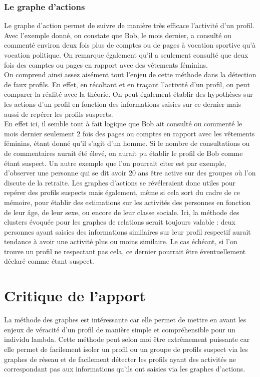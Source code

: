 \documentclass[12pt]{report}
\begin{document}
\subsubsection{Le graphe d'actions}
Le graphe d'action permet de suivre de manière très efficace  l'activité d'un profil. Avec l'exemple donné, on constate que Bob, le mois dernier, a consulté ou commenté environ deux fois plus de comptes ou de pages à vocation sportive qu'à vocation politique. On remarque également qu'il a seulement consulté que deux fois des comptes ou pages en rapport avec des vêtements féminins. \\

On comprend ainsi assez aisément tout l'enjeu de cette méthode dans la détection de faux profils. En effet, en récoltant et en traçant l'activité d'un profil, on peut comparer la réalité avec la théorie. On peut également établir des hypothèses sur les actions d'un profil en fonction des informations saisies sur ce dernier mais aussi de repérer les profils suspects. \\

En effet ici, il semble tout à fait logique que Bob ait consulté ou commenté le mois dernier seulement 2 fois des pages ou comptes en rapport avec les vêtements féminins, étant donné qu'il s'agit d'un homme. Si le nombre de consultations ou de commentaires aurait été élevé, on aurait pu établir le profil de Bob comme étant suspect. Un autre exemple que l'on pourrait citer est par exemple, d'observer une personne qui se dit avoir 20 ans être active sur des groupes où l'on discute de la retraite. Les graphes d'actions se révéleraient donc utiles pour repérer des profils suspects mais également, même si cela sort du cadre de ce mémoire, pour établir des estimations sur les activités des personnes en fonction de leur âge, de leur sexe, ou encore de leur classe sociale. Ici, la méthode des clusters évoquée pour les graphes de relations serait toujours valable : deux personnes ayant saisies des informations similaires sur leur profil respectif aurait tendance à avoir une activité plus ou moins similaire. Le cas échéant, si l'on trouve un profil ne respectant pas cela, ce dernier pourrait être éventuellement déclaré comme étant suspect.

\section{Critique de l'apport}
La méthode des graphes est intéressante car elle permet de mettre en avant les enjeux de véracité d'un profil de manière simple et compréhensible pour un individu lambda. Cette méthode peut selon moi être extrêmement puissante car elle permet de facilement isoler un profil ou un groupe de profils suspect via les graphes de réseau et de facilement détecter les profils ayant des activités ne correspondant pas aux informations qu'ils ont saisies via les graphes d'actions. \\
\end{document}
